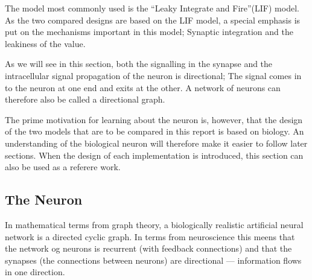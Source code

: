 The model most commonly used is the ``Leaky Integrate and Fire''(LIF) model\cite{florian03}. 
As the two compared designs are based on the LIF model, a special emphasis is put on the mechanisms important in this model; Synaptic integration and the leakiness of the value.

As we will see in this section, both the signalling in the synapse and the intracellular signal propagation of the neuron is directional;
	The signal comes in to the neuron at one end and exits at the other.
A network of neurons can therefore also be called a directional graph.

The prime motivation for learning about the neuron is, however, that the design of the two models that are to be compared in this report is based on biology.
An understanding of the biological neuron will therefore make it easier to follow later sections.
When the design of each implementation is introduced, this section can also be used as a referere work.






\subsection{The Neuron}
\label{ssecTheNeuron}
In mathematical terms from graph theory, a biologically realistic artificial neural network is a directed cyclic graph. 
In terms from neuroscience this meens that the network og neurons is recurrent (with feedback connections) and that the synapses (the connections between neurons) are directional --- information flows in one direction. 

